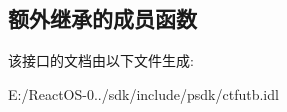 \subsection*{额外继承的成员函数}


该接口的文档由以下文件生成\+:\begin{DoxyCompactItemize}
\item 
E\+:/\+React\+O\+S-\/0../sdk/include/psdk/ctfutb.\+idl\end{DoxyCompactItemize}
